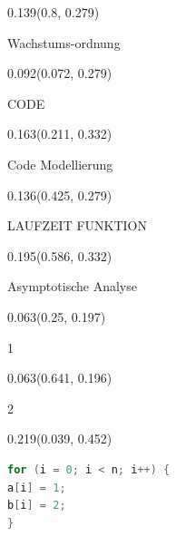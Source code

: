 \documentclass[aspectratio=169]{beamer}
\begin{document}
\begin{frame}[fragile]
  \begin{textblock}{0.139}(0.8, 0.279)
    \begin{minipage}[t][0.161\paperheight]{\linewidth}
      Wachstums-ordnung
    \end{minipage}
  \end{textblock}

  \begin{textblock}{0.092}(0.072, 0.279)
    \begin{minipage}[t][0.161\paperheight]{\linewidth}
      CODE
    \end{minipage}
  \end{textblock}

  \begin{textblock}{0.163}(0.211, 0.332)
    \begin{minipage}[t][0.054\paperheight]{\linewidth}
      Code Modellierung
    \end{minipage}
  \end{textblock}

  \begin{textblock}{0.136}(0.425, 0.279)
    \begin{minipage}[t][0.161\paperheight]{\linewidth}
      LAUFZEIT FUNKTION
    \end{minipage}
  \end{textblock}

  \begin{textblock}{0.195}(0.586, 0.332)
    \begin{minipage}[t][0.054\paperheight]{\linewidth}
      Asymptotische Analyse
    \end{minipage}
  \end{textblock}

  \begin{textblock}{0.063}(0.25, 0.197)
    \begin{minipage}[t][0.111\paperheight]{\linewidth}
      1
    \end{minipage}
  \end{textblock}

  \begin{textblock}{0.063}(0.641, 0.196)
    \begin{minipage}[t][0.111\paperheight]{\linewidth}
      2
    \end{minipage}
  \end{textblock}

  \begin{textblock}{0.219}(0.039, 0.452)
    \begin{minipage}[t][0.139\paperheight]{\linewidth}
      \begin{lstlisting}[language=Java]
for (i = 0; i < n; i++) {
a[i] = 1;
b[i] = 2;
}
      \end{lstlisting}
    \end{minipage}
  \end{textblock}


\end{frame}
\end{document}
